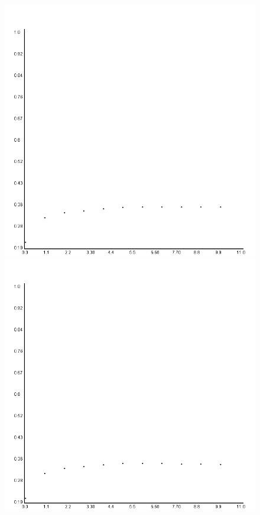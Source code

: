\documentclass{article}
\begin{document}
\begin{figure}
		
		\includegraphics[scale=0.25]{../plots/Wine/scala/ForwardRegressionadjRsq.png}
		\includegraphics[scale=0.25]{../plots/Wine/scala/ForwardRegressioncvRsq.png}
	\end{figure}
\end{document}
